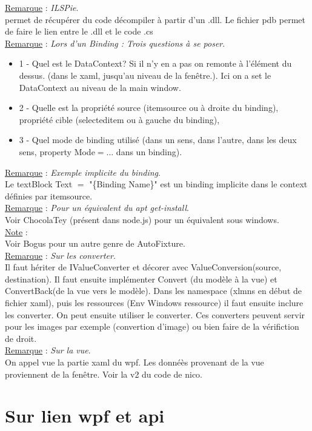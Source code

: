 \documentclass[a4paper,12pt,twoside]{article}
\newcommand{\rem}[2]{\noindent\underline{Remarque} : \textit{#1}.\\ \indent #2}
\newcommand{\note}[1]{\noindent\underline{Note} : \\ \indent #1}
\begin{document}
\rem{ILSPie}{permet de récupérer du code décompiler à partir d'un .dll. Le fichier pdb permet de faire le lien entre le .dll et le code .cs}\\

\rem{Lors d'un Binding : Trois questions à se poser}{\begin{itemize}
\item 1 - Quel est le DataContext? Si il n'y en a pas on remonte à l'élément du dessus. (dans le xaml, jusqu'au niveau de la fenêtre.). Ici on a set le DataContext au niveau de la main window.
\item 2 - Quelle est la propriété source (itemsource ou à droite du binding), propriété cible (selecteditem ou à gauche du binding),
\item 3 - Quel mode de binding utilisé (dans un sens, dans l'autre, dans les deux sens, property Mode$=$... dans un binding).\\
\end{itemize}}

\rem{Exemple implicite du binding}{Le textBlock Text $=$ "\{Binding Name\}" est un binding implicite dans le context définies par itemsource}.\\

\rem{Pour un équivalent du apt get-install}{Voir ChocolaTey (présent dans node.js) pour un équivalent sous windows.}\\

\note{Voir Bogus pour un autre genre de AutoFixture.}\\

\rem{Sur les converter}{Il faut hériter de IValueConverter et décorer avec ValueConversion(source, destination). Il faut ensuite implémenter Convert (du modèle à la vue) et ConvertBack(de la vue vers le modèle). Dans les namespace (xlmns en début de fichier xaml), puis les ressources (Env Windows ressource) il faut ensuite inclure les converter. On peut ensuite utiliser le converter. Ces converters peuvent servir pour les images par exemple (convertion d'image) ou bien faire de la vérifiction de droit.}\\

\rem{Sur la vue}{On appel vue la partie xaml du wpf. Les donnéès provenant de la vue proviennent de la fenêtre. Voir la v2 du code de nico.}\\

\section{Sur lien wpf et api}
\end{document}
